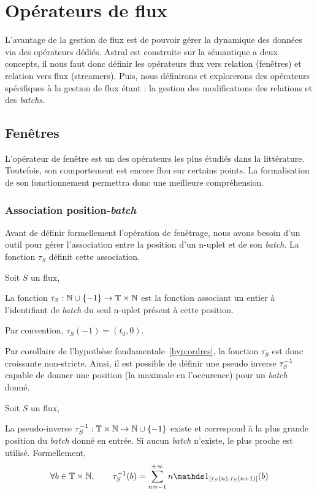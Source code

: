\section{Opérateurs de flux}
L'avantage de la gestion de flux est de pouvoir gérer la dynamique des données via des opérateurs dédiés. Astral est construite sur la sémantique a deux concepts, il nous faut donc définir les opérateurs flux vers relation (fenêtres) et relation vers flux (streamers). Puis, nous définirons et explorerons des opérateurs spécifiques à la gestion de flux étant : la gestion des modifications des relations et des \textit{batchs}.
\subsection{Fenêtres}
L'opérateur de fenêtre est un des opérateurs les plus étudiés dans la littérature. Toutefois, son comportement est encore flou sur certains points. La formalisation de son fonctionnement permettra donc une meilleure compréhension.
\subsubsection{Association position-\textit{batch}}
Avant de définir formellement l'opération de fenêtrage, nous avons besoin d'un outil pour gérer l'association entre la position d'un n-uplet et de son \textit{batch}. La fonction $\tau_S$ définit cette association. 
\begin{defi}\label{def:tau}
    Soit $S$ un flux,

    La fonction $\tau_S : \mathbb{N}\cup\{-1\}\to \mathbb{T}\times\mathbb{N}$ est la fonction associant un entier à l'identifiant de \textit{batch} du seul n-uplet présent à cette position.

    Par convention, $\tau_S(-1)=(t_0,0)$.
\end{defi}

Par corollaire de l'hypothèse fondamentale~\ref{hyp:ordres}, la fonction $\tau_S$ est donc croissante non-stricte. Ainsi, il est possible de définir une pseudo inverse $\tau^{-1}_S$ capable de donner une position (la maximale en l'occurence) pour un \textit{batch} donné.
\begin{coro}
    Soit $S$ un flux,

    La pseudo-inverse $\tau^{-1}_S:\mathbb{T}\times\mathbb{N}\to \mathbb{N}\cup\{-1\}$ existe et correspond à la plus grande position du \textit{batch} donné en entrée. Si aucun \textit{batch} n'existe, le plus proche est utilisé. Formellement, $$\forall b \in \TN, \qquad \tau_S^{-1}(b) = \sum_{n=-1}^{+\infty} n \indic_{[\tau_S(n),\tau_S(n+1)[}(b)$$
\end{coro}

